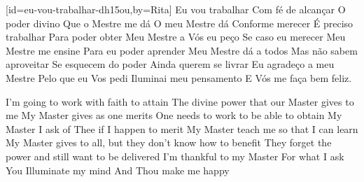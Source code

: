 [id={eu-vou-trabalhar-dh15ou},by={Rita}]
  \beginverse
    \beginrep
      Eu vou trabalhar
      Com fé de alcançar
    \endrep
    \beginrep
      O poder divino
      Que o Mestre me dá
    \endrep
  \endverse
  \beginverse
    \beginrep
      O meu Mestre dá
      Conforme merecer
    \endrep
    \beginrep
      É preciso trabalhar
      Para poder obter
    \endrep
  \endverse
  \beginverse
    \beginrep
      Meu Mestre a Vós eu peço
      Se caso eu merecer
    \endrep
    \beginrep
      Meu Mestre me ensine
      Para eu poder aprender
    \endrep
  \endverse
  \beginverse
    \beginrep
      Meu Mestre dá a todos
      Mas não sabem aproveitar
    \endrep
    \beginrep
      Se esquecem do poder
      Ainda querem se livrar
    \endrep
  \endverse
  \beginverse
    \beginrep
      Eu agradeço a meu Mestre
      Pelo que eu Vos pedi
    \endrep
    \beginrep
      Iluminai meu pensamento
      E Vós me faça bem feliz.
    \endrep
  \endverse
  \begin{translation}[EN]
    I'm going to work with faith to attain
    The divine power that our Master gives to me
    \nextverse
    My Master gives as one merits
    One needs to work to be able to obtain
    \nextverse
    My Master I ask of Thee if I happen to merit
    My Master teach me so that I can learn
    \nextverse
    My Master gives to all, but they don’t know how to benefit
    They forget the power and still want to be delivered
    \nextverse
    I’m thankful to my Master For what I ask
    You Illuminate my mind And Thou make me happy
  \end{translation}
\endsong


